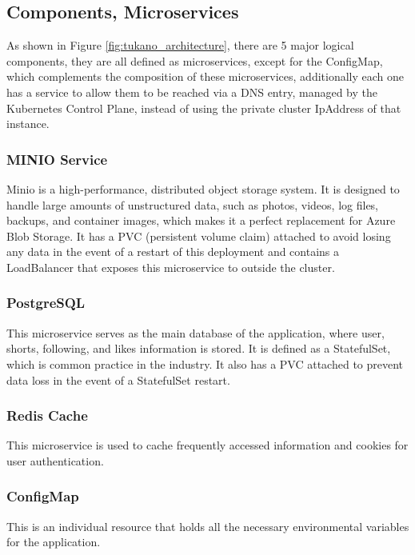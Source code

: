 \documentclass[10pt,a4paper,twocolumn]{article}
\begin{document}
\subsection{Components, Microservices}
As shown in Figure \ref{fig:tukano_architecture}, there are 5 major logical components, they are all defined as microservices, except for the ConfigMap, which complements the composition of these microservices, additionally each one has a service to allow them to be reached via a DNS entry, managed by the Kubernetes Control Plane, instead of using the private cluster IpAddress of that instance.
\subsubsection{MINIO Service}
Minio\cite{minio} is a high-performance, distributed object storage system. It is designed to handle large amounts of unstructured data, such as photos, videos, log files, backups, and container images, which makes it a perfect replacement for Azure Blob Storage. It has a PVC (persistent volume claim) attached to avoid losing any data in the event of a restart of this deployment and contains a LoadBalancer that exposes this microservice to outside the cluster.

\subsubsection{PostgreSQL}
This microservice serves as the main database of the application, where user, shorts, following, and likes information is stored. It is defined as a StatefulSet, which is common practice in the industry. It also has a PVC attached to prevent data loss in the event of a StatefulSet restart.

\subsubsection{Redis Cache}
This microservice is used to cache frequently accessed information and cookies for user authentication.

\subsubsection{ConfigMap}
This is an individual resource that holds all the necessary environmental variables for the application.
\end{document}
